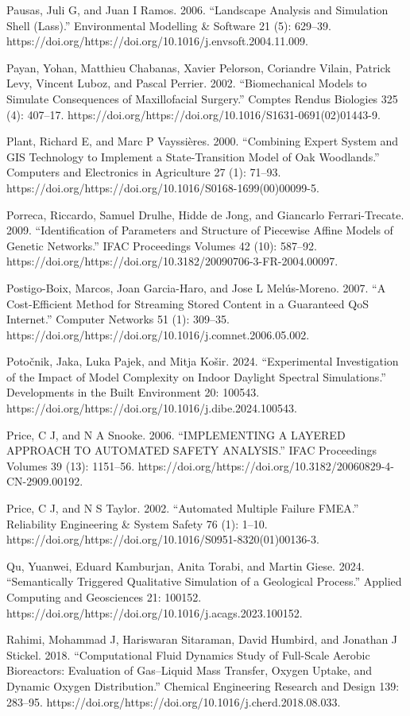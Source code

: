 \documentclass[utf8]{gradu3}
\begin{document}
Pausas, Juli G, and Juan I Ramos. 2006. “Landscape Analysis and Simulation Shell (Lass).” Environmental Modelling \& Software 21 (5): 629–39. https://doi.org/https://doi.org/10.1016/j.envsoft.2004.11.009.

Payan, Yohan, Matthieu Chabanas, Xavier Pelorson, Coriandre Vilain, Patrick Levy, Vincent Luboz, and Pascal Perrier. 2002. “Biomechanical Models to Simulate Consequences of Maxillofacial Surgery.” Comptes Rendus Biologies 325 (4): 407–17. https://doi.org/https://doi.org/10.1016/S1631-0691(02)01443-9.

Plant, Richard E, and Marc P Vayssières. 2000. “Combining Expert System and GIS Technology to Implement a State-Transition Model of Oak Woodlands.” Computers and Electronics in Agriculture 27 (1): 71–93. https://doi.org/https://doi.org/10.1016/S0168-1699(00)00099-5.

Porreca, Riccardo, Samuel Drulhe, Hidde de Jong, and Giancarlo Ferrari-Trecate. 2009. “Identification of Parameters and Structure of Piecewise Affine Models of Genetic Networks.” IFAC Proceedings Volumes 42 (10): 587–92. https://doi.org/https://doi.org/10.3182/20090706-3-FR-2004.00097.

Postigo-Boix, Marcos, Joan Garcia-Haro, and Jose L Melús-Moreno. 2007. “A Cost-Efficient Method for Streaming Stored Content in a Guaranteed QoS Internet.” Computer Networks 51 (1): 309–35. https://doi.org/https://doi.org/10.1016/j.comnet.2006.05.002.

Potočnik, Jaka, Luka Pajek, and Mitja Košir. 2024. “Experimental Investigation of the Impact of Model Complexity on Indoor Daylight Spectral Simulations.” Developments in the Built Environment 20: 100543. https://doi.org/https://doi.org/10.1016/j.dibe.2024.100543.

Price, C J, and N A Snooke. 2006. “IMPLEMENTING A LAYERED APPROACH TO AUTOMATED SAFETY ANALYSIS.” IFAC Proceedings Volumes 39 (13): 1151–56. https://doi.org/https://doi.org/10.3182/20060829-4-CN-2909.00192.

Price, C J, and N S Taylor. 2002. “Automated Multiple Failure FMEA.” Reliability Engineering \& System Safety 76 (1): 1–10. https://doi.org/https://doi.org/10.1016/S0951-8320(01)00136-3.

Qu, Yuanwei, Eduard Kamburjan, Anita Torabi, and Martin Giese. 2024. “Semantically Triggered Qualitative Simulation of a Geological Process.” Applied Computing and Geosciences 21: 100152. https://doi.org/https://doi.org/10.1016/j.acags.2023.100152.

Rahimi, Mohammad J, Hariswaran Sitaraman, David Humbird, and Jonathan J Stickel. 2018. “Computational Fluid Dynamics Study of Full-Scale Aerobic Bioreactors: Evaluation of Gas–Liquid Mass Transfer, Oxygen Uptake, and Dynamic Oxygen Distribution.” Chemical Engineering Research and Design 139: 283–95. https://doi.org/https://doi.org/10.1016/j.cherd.2018.08.033.
\end{document}
